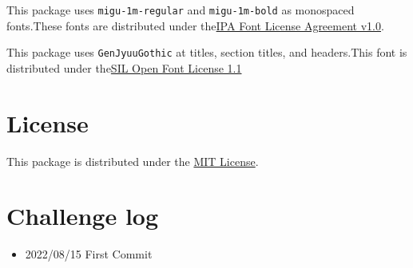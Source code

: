 \documentclass[
  pandoc]{mfg-article}
\providecommand{\tightlist}{%
  \setlength{\itemsep}{0pt}\setlength{\parskip}{0pt}}
\begin{document}
This package uses \texttt{migu-1m-regular} and \texttt{migu-1m-bold} as
monospaced fonts.These fonts are distributed under
the\href{https://mix-mplus-ipa.osdn.jp/migmix/IPA_Font_License_Agreement_v1.0.txt}{IPA
Font License Agreement v1.0}.

This package uses \texttt{GenJyuuGothic} at titles, section titles, and
headers.This font is distributed under
the\href{https://licenses.opensource.jp/OFL-1.1/OFL-1.1.html}{SIL Open
Font License 1.1}

\hypertarget{license}{%
\section{License}\label{license}}

This package is distributed under the \href{./LICENSE}{MIT License}.

\hypertarget{challenge-log}{%
\section{Challenge log}\label{challenge-log}}

\begin{itemize}
\tightlist
\item
  2022/08/15 First Commit
\end{itemize}
\end{document}
